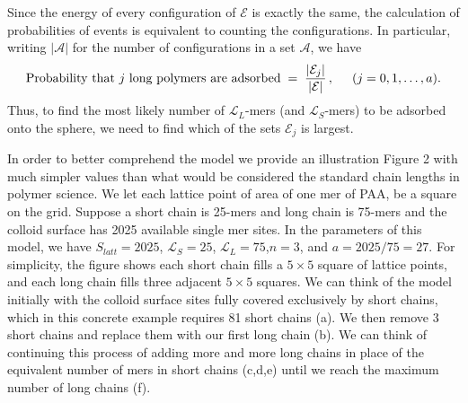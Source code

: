 \documentclass[journal=mamobx,manuscript=article]{achemso}
\newcommand{\leng}{\mathcal{L}}
\begin{document}
Since the energy of every configuration of $\mathcal{E}$ is exactly the same,
the calculation of probabilities of events is equivalent to counting the configurations.
In particular, writing $|\mathcal{A}|$ for the number of configurations in a set $\mathcal{A}$, we have
\[
    \hbox{Probability that $j$ long polymers are adsorbed}  \;=\; 
    \frac{|\mathcal{E}_j|}{|\mathcal{E}|}\,,   \hspace{5mm}(j=0,1,\ldots,a).
\]
Thus, to find the most likely number of $\leng_L$-mers (and $\leng_S$-mers) to be adsorbed onto the sphere,
we need to find which of the sets $\mathcal{E}_j$ is largest.


In order to better comprehend the model we provide an illustration Figure 2 with much simpler values than what would be considered the standard chain lengths in polymer science. We let each lattice point of area of one mer of PAA, be a square on the grid. 
Suppose a short chain is %
25-mers and long chain is 75-mers and the colloid surface has 2025 available single mer sites.
In the parameters of this model, we have 
$S_{latt}=2025$, $\leng_S=25$,
$\leng_L=75$,$n=3$, and $a=2025/75=27$.
For simplicity, the figure shows each short chain
fills a $5\times 5$ square of lattice points, and each
long chain fills three adjacent $5\times 5$ squares.
We can think of the model initially with the colloid surface sites fully covered exclusively by short chains, which in this concrete example requires 81 short chains (a). We then remove 3 short chains and replace them with our first long chain (b). 
We can think of continuing this process of adding more and more long chains in place of the equivalent number of mers in short chains (c,d,e) until we reach the maximum number of long chains (f).
\end{document}
